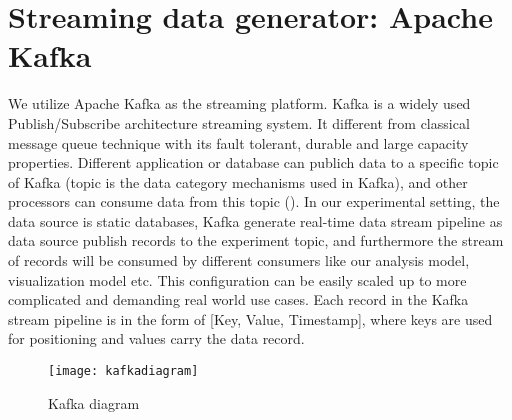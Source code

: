 \section{Streaming data generator: Apache Kafka}
\label{sec:Streaming data generator: Apache Kafka}

We utilize Apache Kafka as the streaming platform. Kafka is a widely used Publish/Subscribe architecture streaming system. It different from classical message queue technique with its fault tolerant, durable and large capacity properties. Different application or database can publich data to a specific topic of Kafka (topic is the data category mechanisms used in Kafka), and other processors can consume data from this topic (). In our experimental setting, the data source is static databases, Kafka generate real-time data stream pipeline as data source publish records to the experiment topic, and furthermore the stream of records will be consumed by different consumers like our analysis model, visualization model etc. This configuration can be easily scaled up to more complicated and demanding real world use cases. Each record in the Kafka stream pipeline is in the form of [Key, Value, Timestamp], where keys are used for positioning and values carry the data record.

\begin{figure}[h]
\centering
\texttt{[image: kafkadiagram]}
\caption[Kafka diagram]{Kafka diagram}
\label{fig:kafka}
\end{figure}


